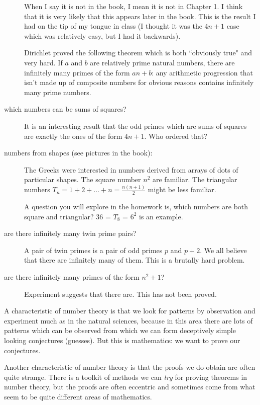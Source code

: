 \documentclass[12pt]{article}
\begin{document}
\begin{description}
\begin{description}
\end{description}

When I say it is not in the book, I mean it is not in Chapter 1.  I think that it is very likely that this appears later in the book.  This is the result I had on the tip of my tongue in class (I thought it was the $4n+1$ case which was relatively easy, but I had it backwards).

Dirichlet proved the following theorem which is both ``obviously true" and very hard.  If $a$ and $b$ are relatively prime natural numbers, there are infinitely many primes of the form $an+b$:  any arithmetic progression that isn't made up of composite numbers for obvious reasons contains infinitely many prime numbers.

\item[which numbers can be sums of squares?]  It is an interesting result that the odd primes which are sums of squares
are exactly the ones of the form $4n+1$.   Who ordered that?

\item[numbers from shapes (see pictures in the book):]   The Greeks were interested in numbers derived from arrays of dots of particular shapes.   The square number $n^2$ are familiar.   The triangular numbers $T_n = 1+2+\ldots+n = \frac{n(n+1)}2$ might be less familiar.

A question you will explore in the homework is, which numbers are both square and triangular?  36 = $T_8$ = $6^2$ is an example.

\item[are there infinitely many twin prime pairs?]  A pair of twin primes is a pair of odd primes $p$ and $p+2$.   We all believe that there are infinitely many of them.   This is a brutally hard problem.

\item[are there infinitely many primes of the form $n^2+1$?]   Experiment suggests that there are.   This has not been proved.

\end{description}

A characteristic of number theory is that we look for patterns by observation and experiment much as in the natural sciences, because in this area there are lots of patterns which can be observed from which we can form deceptively simple looking conjectures (guesses).   But this is mathematics:  we want to prove our conjectures.

Another characteristic of number theory is that the proofs we do obtain are often quite strange.  There is a toolkit of methods we can {\em try\/} for proving theorems in number theory, but the proofs are often eccentric and sometimes come from what seem to be quite different areas of mathematics.
\end{document}
